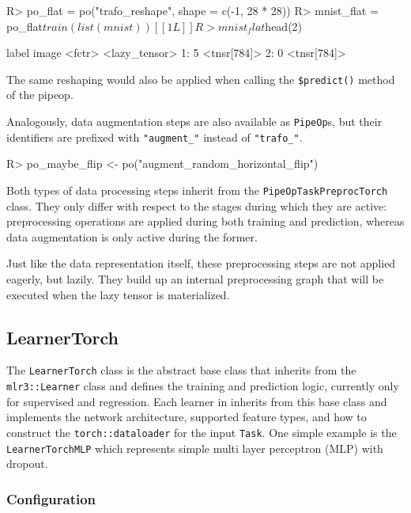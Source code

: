 \documentclass[article, nojss]{jss}
\theoremstyle{definition}
\begin{document}
\begin{CodeInput}
R> po_flat = po("trafo_reshape", shape = c(-1, 28 * 28))
R> mnist_flat = po_flat$train(list(mnist))[[1L]]
R> mnist_flat$head(2)
\end{CodeInput}
\begin{CodeOutput}
    label         image
   <fctr> <lazy_tensor>
1:      5   <tnsr[784]>
2:      0   <tnsr[784]>
\end{CodeOutput}

The same reshaping would also be applied when calling the \texttt{\$predict()} method of the pipeop.

Analogously, data augmentation steps are also available as \texttt{PipeOp}s, but their identifiers are prefixed with \texttt{"augment\_"} instead of \texttt{"trafo\_"}. 

\begin{CodeInput}
R> po_maybe_flip <- po("augment_random_horizontal_flip")
\end{CodeInput}

Both types of data processing steps inherit from the \texttt{PipeOpTaskPreprocTorch} class.
They only differ with respect to the stages during which they are active: preprocessing operations are applied during both training and prediction, whereas data augmentation is only active during the former.

Just like the data representation itself, these preprocessing steps are not applied eagerly, but lazily.
They build up an internal preprocessing graph that will be executed when the lazy tensor is materialized.

\subsection{LearnerTorch}

The \texttt{LearnerTorch}  class is the abstract base class that inherits from the \texttt{mlr3::Learner} class and defines the training and prediction logic, currently only for supervised and regression.
Each learner in  inherits from this base class and implements the network architecture, supported feature types, and how to construct the \texttt{torch::dataloader} for the input \texttt{Task}.
One simple example is the \texttt{LearnerTorchMLP} which represents simple multi layer perceptron (MLP) with dropout.

\subsubsection{Configuration}
\end{document}
